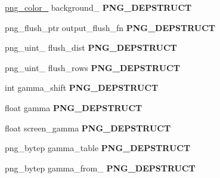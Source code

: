 \begin{DoxyCompactItemize}
\item 
\hyperlink{structpng__color__16__struct}{png\+\_\+color\+\_} background\+\_ {\bfseries P\+N\+G\+\_\+\+D\+E\+P\+S\+T\+R\+U\+CT}\hypertarget{structpng__struct__def_a80f627516808f53bd5dd7041a3fe1410}{}\label{structpng__struct__def_a80f627516808f53bd5dd7041a3fe1410}

\item 
png\+\_\+flush\+\_\+ptr output\+\_\+flush\+\_\+fn {\bfseries P\+N\+G\+\_\+\+D\+E\+P\+S\+T\+R\+U\+CT}\hypertarget{structpng__struct__def_ab802fad7d34e23734d8be5047e64589e}{}\label{structpng__struct__def_ab802fad7d34e23734d8be5047e64589e}

\item 
png\+\_\+uint\+\_ flush\+\_\+dist {\bfseries P\+N\+G\+\_\+\+D\+E\+P\+S\+T\+R\+U\+CT}\hypertarget{structpng__struct__def_abe47454df3d4103a6f8e1d4bcc03ff7b}{}\label{structpng__struct__def_abe47454df3d4103a6f8e1d4bcc03ff7b}

\item 
png\+\_\+uint\+\_ flush\+\_\+rows {\bfseries P\+N\+G\+\_\+\+D\+E\+P\+S\+T\+R\+U\+CT}\hypertarget{structpng__struct__def_a26ad8c12015cb6db5dde1f4ad4ea71dc}{}\label{structpng__struct__def_a26ad8c12015cb6db5dde1f4ad4ea71dc}

\item 
int gamma\+\_\+shift {\bfseries P\+N\+G\+\_\+\+D\+E\+P\+S\+T\+R\+U\+CT}\hypertarget{structpng__struct__def_ac1b67606e81ff447791d68badf01c64f}{}\label{structpng__struct__def_ac1b67606e81ff447791d68badf01c64f}

\item 
float gamma {\bfseries P\+N\+G\+\_\+\+D\+E\+P\+S\+T\+R\+U\+CT}\hypertarget{structpng__struct__def_a024b7f2fef89b0b2190900f70ca65b02}{}\label{structpng__struct__def_a024b7f2fef89b0b2190900f70ca65b02}

\item 
float screen\+\_\+gamma {\bfseries P\+N\+G\+\_\+\+D\+E\+P\+S\+T\+R\+U\+CT}\hypertarget{structpng__struct__def_a57c912a7394bd484815a8cdd6331ffb1}{}\label{structpng__struct__def_a57c912a7394bd484815a8cdd6331ffb1}

\item 
png\+\_\+bytep gamma\+\_\+table {\bfseries P\+N\+G\+\_\+\+D\+E\+P\+S\+T\+R\+U\+CT}\hypertarget{structpng__struct__def_acd7d56e667ffed3fca2e364a40b51db0}{}\label{structpng__struct__def_acd7d56e667ffed3fca2e364a40b51db0}

\item 
png\+\_\+bytep gamma\+\_\+from\+\_ {\bfseries P\+N\+G\+\_\+\+D\+E\+P\+S\+T\+R\+U\+CT}\hypertarget{structpng__struct__def_a3e62e616a5d653151a9b65455483d3b4}{}\label{structpng__struct__def_a3e62e616a5d653151a9b65455483d3b4}


\end{DoxyCompactItemize}
